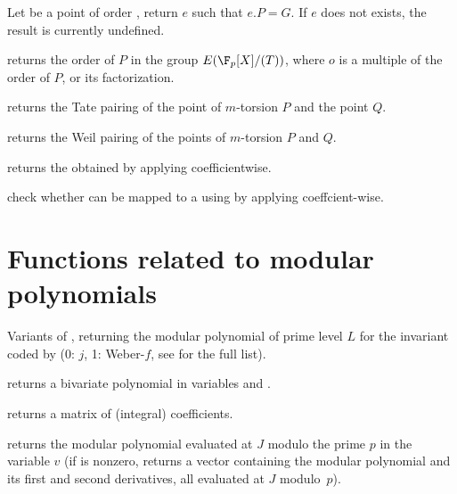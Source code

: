 





 Let  be a
point of order , return $e$ such that $e.P=G$. If $e$ does not exists,
the result is currently undefined.

 returns the order
of $P$ in the group $E(\F_p[X]/(T))$, where $o$ is a multiple of the order of
$P$, or its factorization.

returns the Tate pairing of the point of $m$-torsion $P$ and the point $Q$.

returns the Weil pairing of the points of $m$-torsion $P$ and $Q$.

 returns the  obtained
by applying  coefficientwise.

 check whether  can
be mapped to a  using  by applying 
coeffcient-wise.

\section{Functions related to modular polynomials}

Variants of , returning the modular polynomial of prime
level $L$ for the invariant coded by  (0: $j$, 1: Weber-$f$, see
 for the full list).

returns a bivariate polynomial in variables  and .

 returns a matrix of
(integral) coefficients.

 returns the modular polynomial evaluated
at $J$ modulo the prime $p$ in the variable $v$ (if  is nonzero,
returns a vector containing the modular polynomial and its first and second
derivatives, all evaluated at $J$ modulo~$p$).

